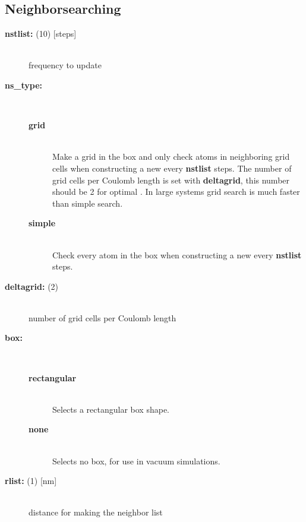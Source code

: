 \subsection{Neighborsearching}
\begin{description}
\item[{\bf nstlist: }(10) {[steps]}]\mbox{}\\
frequency to update 
\item[{\bf ns\_type:}]\mbox{}\\
\vspace{-2ex}\begin{description}
\item[{\bf grid}]\mbox{}\\
Make a grid in the box and only check atoms in neighboring 
grid cells when constructing a new  every {\bf nstlist} steps. 
The number of grid cells per Coulomb  length is set with 
{\bf deltagrid},
this number should be 2 for optimal .
In large systems grid search is much faster than simple search. 
\item[{\bf simple}]\mbox{}\\
Check every atom in the box when constructing a new 
every {\bf nstlist} steps.
\end{description}
\item[{\bf deltagrid: }(2)]\mbox{}\\
number of grid cells per Coulomb  length
\item[{\bf box:}]\mbox{}\\
\vspace{-2ex}\begin{description}
\item[{\bf rectangular}]\mbox{}\\
Selects a rectangular box shape.
\item[{\bf none}]\mbox{}\\
Selects no box, for use in vacuum simulations.
\end{description}
\item[{\bf rlist: }(1) {[nm]}]\mbox{}\\
 distance for making the neighbor list
\end{description}

